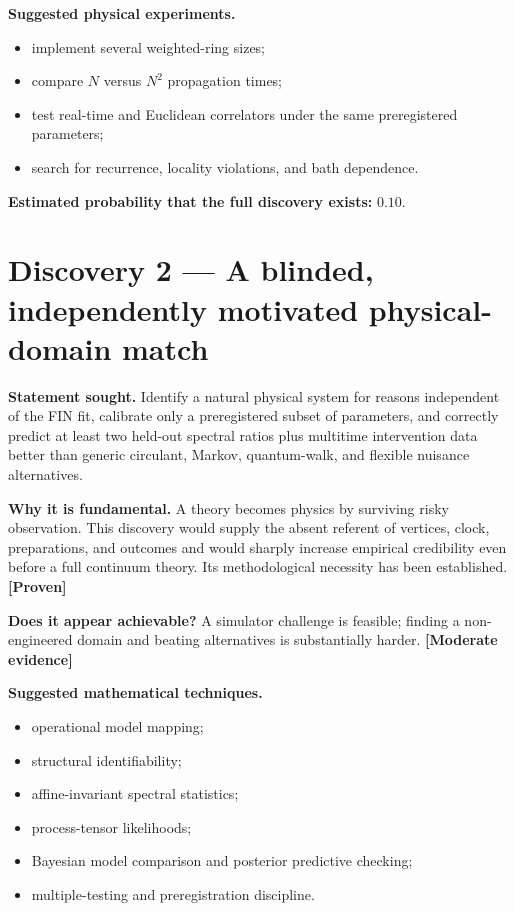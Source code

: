 \documentclass[11pt,a4paper,openany]{report}
\newcommand{\statusProven}{\textcolor{fingreen}{[Proven]}}
\newcommand{\statusModerate}{\textcolor{finviolet}{[Moderate evidence]}}
\begin{document}
\textbf{Suggested physical experiments.}

\begin{itemize}
\item 
implement several weighted-ring sizes;

\item 
compare \(N\) versus \(N^2\) propagation times;

\item 
test real-time and Euclidean correlators under the same preregistered parameters;

\item 
search for recurrence, locality violations, and bath dependence.

\end{itemize}

\textbf{Estimated probability that the full discovery exists:} \(0.10\).

\section{Discovery 2 — A blinded, independently motivated physical-domain match}

\textbf{Statement sought.} Identify a natural physical system for reasons independent of the FIN fit, calibrate only a preregistered subset of parameters, and correctly predict at least two held-out spectral ratios plus multitime intervention data better than generic circulant, Markov, quantum-walk, and flexible nuisance alternatives.

\textbf{Why it is fundamental.} A theory becomes physics by surviving risky observation. This discovery would supply the absent referent of vertices, clock, preparations, and outcomes and would sharply increase empirical credibility even before a full continuum theory. Its methodological necessity has been established. \textbf{\statusProven{}}

\textbf{Does it appear achievable?} A simulator challenge is feasible; finding a non-engineered domain and beating alternatives is substantially harder. \textbf{\statusModerate{}}

\textbf{Suggested mathematical techniques.}

\begin{itemize}
\item 
operational model mapping;

\item 
structural identifiability;

\item 
affine-invariant spectral statistics;

\item 
process-tensor likelihoods;

\item 
Bayesian model comparison and posterior predictive checking;

\item 
multiple-testing and preregistration discipline.

\end{itemize}
\end{document}
